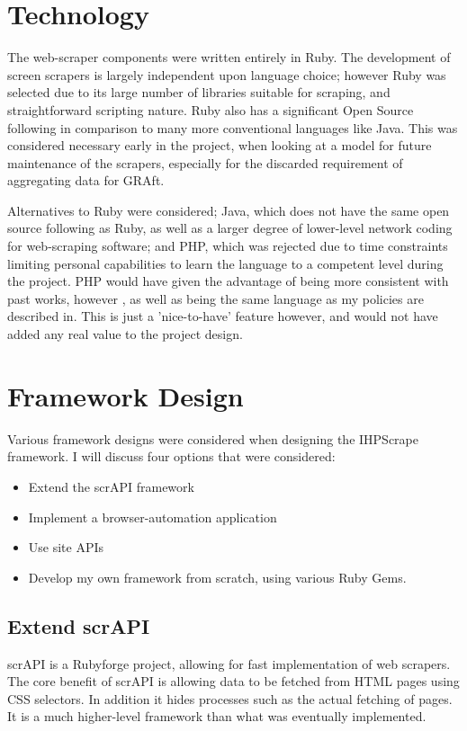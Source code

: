 \section{Technology}


The web-scraper components were written entirely in Ruby. The development of screen scrapers is largely independent upon language choice; however Ruby was selected due to its large number of libraries suitable for scraping, and straightforward scripting nature. Ruby also has a significant Open Source following in comparison to many more conventional languages like Java. This was considered necessary early in the project, when looking at a model for future maintenance of the scrapers, especially for the discarded requirement of aggregating data for GRAft. 

Alternatives to Ruby were considered; Java, which does not have the same open source following as Ruby, as well as a larger degree of lower-level network coding for web-scraping software; and PHP, which was rejected due to time constraints limiting personal capabilities to learn the language to a competent level during the project. PHP would have given the advantage of being more consistent with past works, however \cite{GRAft}, as well as being the same language as my policies are described in. This is just a 'nice-to-have' feature however, and would not have added any real value to the project design.

\section{Framework Design}

Various framework designs were considered when designing the IHPScrape framework. I will discuss four options that were considered:

\begin{itemize}
 \item Extend the scrAPI framework
 \item Implement a browser-automation application
 \item Use site APIs
 \item Develop my own framework from scratch, using various Ruby Gems.
\end{itemize}

\subsection{Extend scrAPI}
scrAPI is a Rubyforge project, allowing for fast implementation of web scrapers. The core benefit of scrAPI is allowing data to be fetched from HTML pages using CSS selectors. In addition it hides processes such as the actual fetching of pages. It is a much higher-level framework than what was eventually implemented.

